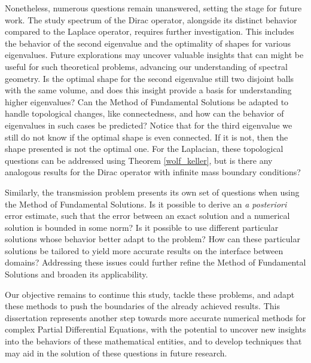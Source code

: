 Nonetheless, numerous questions remain unanswered, setting the stage for future work. The study spectrum of the Dirac operator, alongside its distinct behavior compared to the Laplace operator, requires further investigation. This includes the behavior of the second eigenvalue and the optimality of shapes for various eigenvalues. Future explorations may uncover valuable insights that can might be useful for such theoretical problems, advancing our understanding of spectral geometry. Is the optimal shape for the second eigenvalue still two disjoint balls with the same volume, and does this insight provide a basis for understanding higher eigenvalues? Can the Method of Fundamental Solutions be adapted to handle topological changes, like connectedness, and how can the behavior of eigenvalues in such cases be predicted? Notice that for the third eigenvalue we still do not know if the optimal shape is even connected. If it is not, then the shape presented is not the optimal one. For the Laplacian, these topological questions can be addressed using Theorem \ref{wolf_keller}, but is there any analogous results for the Dirac operator with infinite mass boundary conditions?

Similarly, the transmission problem presents its own set of questions when using the Method of Fundamental Solutions. Is it possible to derive an \textit{a posteriori} error estimate, such that the error between an exact solution and a numerical solution is bounded in some norm? Is it possible to use different particular solutions whose behavior better adapt to the problem? How can these particular solutions be tailored to yield more accurate results on the interface between domains? Addressing these issues could further refine the Method of Fundamental Solutions and broaden its applicability. 

Our objective remains to continue this study, tackle these problems, and adapt these methods to push the boundaries of the already achieved results. This dissertation represents another step towards more accurate numerical methods for complex Partial Differential Equations, with the potential to uncover new insights into the behaviors of these mathematical entities, and to develop techniques that may aid in the solution of these questions in future research.